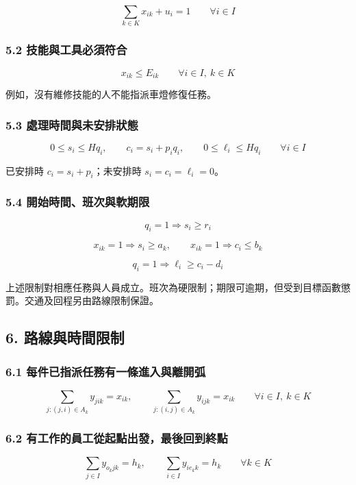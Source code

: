 \documentclass[UTF8,fontset=fandol]{ctexart}
\begin{document}
\[
\sum_{k\in K}x_{ik}+u_i=1
\qquad \forall i\in I
\]

\subsubsection*{5.2 技能與工具必須符合}

\[
x_{ik}\le E_{ik}
\qquad \forall i\in I,\ k\in K
\]

例如，沒有維修技能的人不能指派車燈修復任務。

\subsubsection*{5.3 處理時間與未安排狀態}

\[
0\le s_i\le Hq_i,\qquad
c_i=s_i+p_iq_i,\qquad
0\le\ell_i\le Hq_i
\qquad \forall i\in I
\]

已安排時 $c_i=s_i+p_i$；未安排時 $s_i=c_i=\ell_i=0$。

\subsubsection*{5.4 開始時間、班次與軟期限}

\[
q_i=1\Rightarrow s_i\ge r_i
\]

\[
x_{ik}=1\Rightarrow s_i\ge a_k,\qquad
x_{ik}=1\Rightarrow c_i\le b_k
\]

\[
q_i=1\Rightarrow\ell_i\ge c_i-d_i
\]

上述限制對相應任務與人員成立。班次為硬限制；期限可逾期，但受到目標函數懲罰。交通及回程另由路線限制保證。

\subsection*{6. 路線與時間限制}

\subsubsection*{6.1 每件已指派任務有一條進入與離開弧}

\[
\sum_{j:(j,i)\in A_k}y_{jik}=x_{ik},\qquad
\sum_{j:(i,j)\in A_k}y_{ijk}=x_{ik}
\qquad \forall i\in I,\ k\in K
\]

\subsubsection*{6.2 有工作的員工從起點出發，最後回到終點}

\[
\sum_{j\in I}y_{o_kjk}=h_k,\qquad
\sum_{i\in I}y_{ie_kk}=h_k
\qquad \forall k\in K
\]
\end{document}
